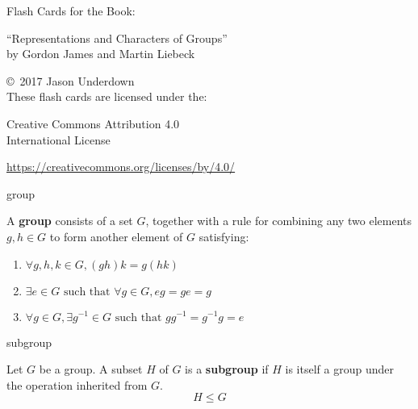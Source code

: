 \documentclass[avery5371,grid]{flashcards}
\newcommand{\st}{\textrm{ such that }}
\renewcommand{\le}{\leqslant}
\newcommand{\defn}[1]{\textbf{#1}}
\begin{document}
\begin{flashcard}[Copying]
  { Flash Cards for the Book:

    \begin{center}
      ``Representations and Characters of Groups'' \\
      by Gordon James and Martin Liebeck
    \end{center}
  }
  \copyright\ 2017 Jason Underdown \\

  These flash cards are licensed under the:
  \begin{center}
    Creative Commons Attribution 4.0 \\
    International License \\
    \ccby
  \end{center}
  \url{https://creativecommons.org/licenses/by/4.0/}
\end{flashcard}

\begin{flashcard}[Definition]{group}

  A \defn{group} consists of a set $G$, together with a rule for
  combining any two elements $g, h \in G$ to form another element of
  $G$ satisfying:
  \begin{enumerate}
  \item $\forall g,h,k \in G, (gh)k = g(hk)$
  \item $\exists e \in G \st \forall g \in G, eg=ge=g$
  \item $\forall g \in G, \exists g^{-1} \in G \st gg^{-1} = g^{-1}g = e$
  \end{enumerate}

\end{flashcard}

\begin{flashcard}[Definition]{subgroup}

Let $G$ be a group. A subset $H$ of $G$ is a \defn{subgroup} if $H$ is
itself a group under the operation inherited from $G$.
\[
  H \le G
\]

\end{flashcard}
\end{document}
